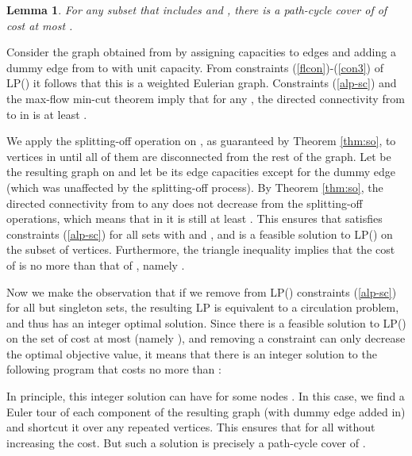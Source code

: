 \documentclass[11pt]{article}
\newcommand{\qed}{\hspace*{\fill}}
\newtheorem{lemma}[theorem]{Lemma}
\newenvironment{proof}[1][Proof. ]{\noindent {\bf #1 }}{\qed}
\begin{document}
\begin{lemma} \label{lem:pathcyc}
For any subset  that includes  and , there is 
a path-cycle cover of  of cost at most .
\end{lemma}
\begin{proof}
Consider the graph  obtained from  by assigning capacities  to edges  and adding a dummy edge from  to  with unit capacity. From constraints (\ref{flcon})-(\ref{con3}) of LP() it follows that this is a weighted Eulerian graph. Constraints (\ref{alp-sc}) and the max-flow min-cut theorem imply that for any , the directed connectivity from  to  in  is at least .

We apply the splitting-off operation on , as guaranteed by Theorem \ref{thm:so}, to vertices in  until all of them are disconnected from the rest of the graph. Let  be the resulting graph on  and let  be its edge capacities except for the dummy edge  (which was unaffected by the splitting-off process).
By Theorem \ref{thm:so}, the directed connectivity from  to any  does not decrease from the splitting-off operations, which means that in  it is still at least . This ensures that  satisfies constraints (\ref{alp-sc}) for all sets  with  and 
, and is a feasible solution to LP() on the subset  of vertices. Furthermore, the triangle inequality implies that the cost of  is no more than that of , namely .

Now we make the observation that if we remove from LP() constraints (\ref{alp-sc}) for all but singleton sets, the resulting LP is equivalent to a circulation problem, and thus has an integer 
optimal solution. Since there is a feasible solution to LP() on the set  of cost at most  (namely ), and removing a 
constraint can only decrease the optimal objective value, it means that there is an integer solution to the following program that costs no more than :

In principle, this integer solution can have  
for some nodes . In this case, we find a Euler tour of each component of the resulting graph (with dummy edge  added in) and shortcut it over any repeated vertices. This ensures that  for all  without increasing the cost. 
But such a solution is precisely a path-cycle cover of .
\end{proof}

\medskip
\end{document}
